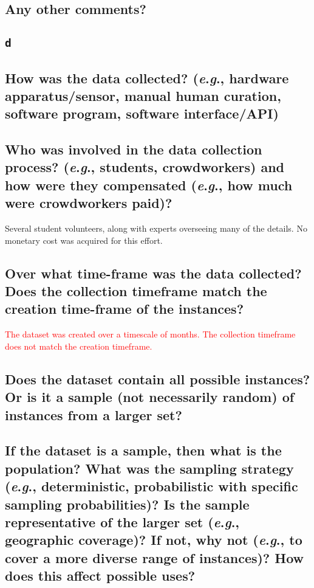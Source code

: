 \documentclass[a4paper,9pt]{extarticle}
\newcommand{\eg}{\textit{e}.\textit{g}., }
\begin{document}
\begin{multicols}{2}
\subsection*{Any other comments?}
\noindent 

\subsection*{\texttt{d}}
\noindent 

\subsection*{How was the data collected? (\eg hardware apparatus/sensor, manual human curation, software program, software interface/API)}
\noindent


\subsection*{Who was involved in the data collection process? (\eg students, crowdworkers) and how were they compensated (\eg how much were crowdworkers paid)?}
\noindent Several student volunteers, along with experts overseeing many of the details. No monetary cost was acquired for this effort.

\subsection*{Over what time-frame was the data collected? Does the collection timeframe match the creation time-frame of the instances?}
\noindent
\textcolor{red}{
The dataset was created over a timescale of months. The collection timeframe does not match the creation timeframe.}


\subsection*{Does the dataset contain all possible instances? Or is it a sample (not necessarily random) of instances from a larger set?}
\noindent
\subsection*{If the dataset is a sample, then what is the population? What was the sampling strategy (\eg deterministic, probabilistic with specific sampling probabilities)? Is the sample representative of the larger set (\eg geographic coverage)? If not, why not (\eg to cover a more diverse range of instances)? How does this affect possible uses?}
\noindent

\end{multicols}
\end{document}
